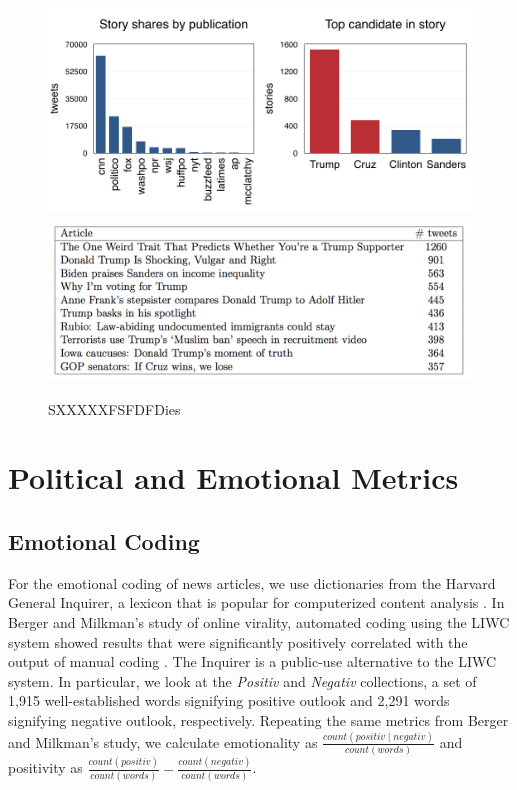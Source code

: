 \documentclass[letterpaper]{article}
\begin{document}
\begin{figure}[t!]
\centering 
  \includegraphics[width=\linewidth]{story-stats-horizontal}  
  \includegraphics[width=\linewidth]{top-10-stories}    
  \caption{SXXXXXFSFDFDies
    \label{fig:story-stats}}
\end{figure}  

\section{Political and Emotional Metrics}
\subsection{Emotional Coding}
For the emotional coding of news articles, we use dictionaries from the Harvard General Inquirer, a lexicon that is popular for computerized content analysis \cite{stone1963computer}. In Berger and Milkman's study of online virality, automated coding using the LIWC system showed results that were significantly positively correlated with the output of manual coding \cite{berger2012makes}. The Inquirer is a public-use alternative to the LIWC system. In particular, we look at the \emph{Positiv} and \emph{Negativ} collections, a set of 1,915 well-established words signifying positive outlook and 2,291 words signifying negative outlook, respectively. Repeating the same metrics from Berger and Milkman's study, we calculate emotionality as $\frac{count(positiv \mid negativ)}{count(words)}$ and positivity as $\frac{count(positiv)}{count(words)} - \frac{count(negativ)}{count(words)}$.
\end{document}
